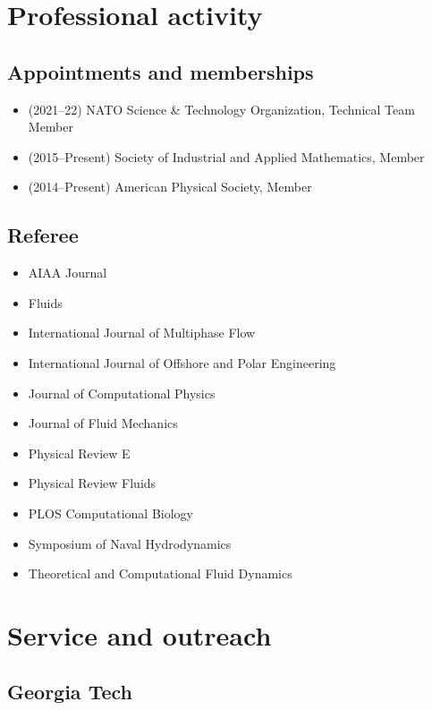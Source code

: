 % 

\section{Professional activity}

\subsection{Appointments and memberships}

\begin{itemize}
    \item (2021--22) NATO Science \& Technology Organization, Technical Team Member
    \item (2015--Present) Society of Industrial and Applied Mathematics, Member
    \item (2014--Present) American Physical Society, Member
\end{itemize}

\subsection{Referee}

\begin{itemize}
    \item AIAA Journal
    \item Fluids
    \item International Journal of Multiphase Flow
    \item International Journal of Offshore and Polar Engineering
    \item Journal of Computational Physics
    \item Journal of Fluid Mechanics
    \item Physical Review E
    \item Physical Review Fluids
    \item PLOS Computational Biology
    \item Symposium of Naval Hydrodynamics
    \item Theoretical and Computational Fluid Dynamics
\end{itemize}



\section{Service and outreach}

\subsection{Georgia Tech}

